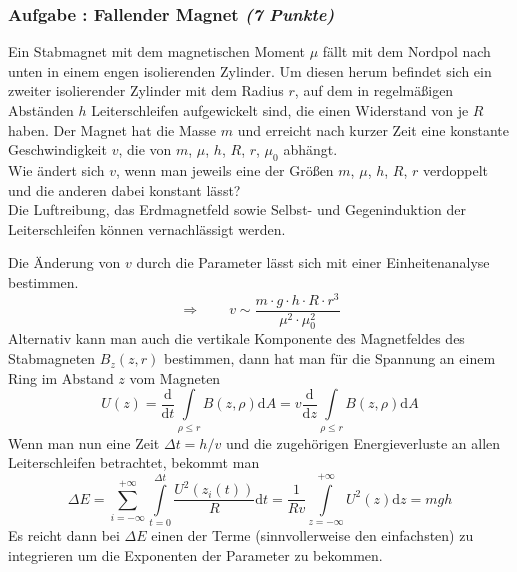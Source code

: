 \documentclass[12pt,a4paper]{article}
\newcommand{\dif}{\mathrm{d}}
\newcommand{\tdif}[2]{\frac{\dif#1}{\dif#2}}
\newcounter{numlabel}
\newenvironment{problem}[2]{\stepcounter{numlabel} \vspace{1ex} \subsubsection*{Aufgabe \the\value{numlabel}: #1 \emph{(#2 Punkte)}} \renewcommand{\Currentlabel}{Aufgabe \the\value{numlabel}: #1}}{

}
\begin{document}
\begin{problem}{Fallender Magnet}{7}
Ein Stabmagnet mit dem magnetischen Moment $\mu$ fällt mit dem Nordpol nach unten in einem engen isolierenden Zylinder. Um diesen herum befindet sich ein zweiter isolierender Zylinder mit dem Radius $r$, auf dem in regelmäßigen Abständen $h$ Leiterschleifen aufgewickelt sind, die einen Widerstand von je $R$ haben. Der Magnet hat die Masse $m$ und erreicht nach kurzer Zeit eine konstante Geschwindigkeit $v$, die von $m$, $\mu$, $h$, $R$, $r$, $\mu_0$ abhängt.\\
Wie ändert sich $v$, wenn man jeweils eine der Größen $m$, $\mu$, $h$, $R$, $r$ verdoppelt und die anderen dabei konstant lässt?\\
Die Luftreibung, das Erdmagnetfeld sowie Selbst- und Gegeninduktion der Leiterschleifen können vernachlässigt werden.
\begin{solution}
Die Änderung von $v$ durch die Parameter lässt sich mit einer Einheitenanalyse bestimmen.
\[
\Rightarrow\qquad v \sim \frac{m\cdot g\cdot h\cdot R \cdot r^3}{\mu^2\cdot \mu_0^2}
\]
Alternativ kann man auch die vertikale Komponente des Magnetfeldes des Stabmagneten $B_z(z,r)$ bestimmen, dann hat man für die Spannung an einem Ring im Abstand $z$ vom Magneten
\[
U(z) = \tdif{}{t} \int\limits_{\rho \leq r} B(z,\rho) \dif A = v \tdif{}{z} \int\limits_{\rho \leq r} B(z,\rho) \dif A
\]
Wenn man nun eine Zeit $\Delta t = h/v$ und die zugehörigen Energieverluste an allen Leiterschleifen betrachtet, bekommt man
\[
\Delta E = \sum_{i=-\infty}^{+\infty} \int\limits_{t=0}^{\Delta t} \frac{U^2(z_i(t))}{R} \dif t
= \frac{1}{Rv} \int\limits_{z=-\infty}^{+\infty} U^2(z) \dif z = mgh
\]
Es reicht dann bei $\Delta E$ einen der Terme (sinnvollerweise den einfachsten) zu integrieren um die Exponenten der Parameter zu bekommen.

\end{solution}
\end{problem}













\end{document}
